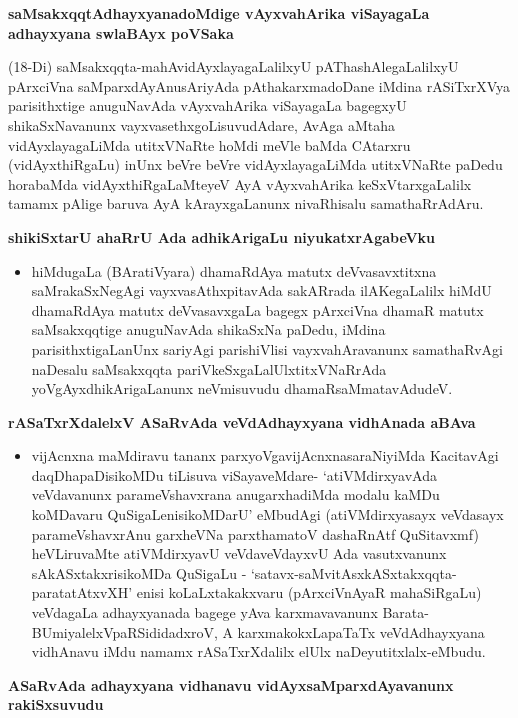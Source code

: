 \noindent
\textbf{saMsakxqqtAdhayxyanadoMdige vAyxvahArika viSayagaLa adhayxyana swlaBAyx poVSaka}\label{page47}

(18-Di) saMsakxqqta-mahAvidAyxlayagaLalilxyU pAThashAlegaLalilxyU pArxciVna saMparxdAyAnusAriyAda pAthakarxmadoDane iMdina rASiTxrXVya parisithxtige anuguNavAda vAyxvahArika viSayagaLa bagegxyU shikaSxNavanunx vayxvasethxgoLisuvudAdare, AvAga aMtaha vidAyxlayagaLiMda utitxVNaRte hoMdi meVle baMda CAtarxru (vidAyxthiRgaLu) inUnx beVre beVre vidAyxlayagaLiMda utitxVNaRte paDedu horabaMda vidAyxthiRgaLaMteyeV AyA vAyxvahArika keSxVtarxgaLalilx tamamx pAlige baruva AyA kArayxgaLanunx nivaRhisalu samathaRrAdAru.

\noindent
\textbf{shikiSxtarU ahaRrU Ada adhikArigaLu niyukatxrAgabeVku}

\begin{itemize}
\item[18-ef] hiMdugaLa (BAratiVyara) dhamaRdAya matutx deVvasavxtitxna saMrakaSxNegAgi vayxvasAthxpitavAda sakARrada ilAKegaLalilx hiMdU dhamaRdAya matutx deVvasavxgaLa bagegx pArxciVna dhamaR matutx saMsakxqqtige anuguNavAda shikaSxNa paDedu, iMdina parisithxtigaLanUnx sariyAgi parishiVlisi vayxvahAravanunx samathaRvAgi naDesalu saMsakxqqta pariVkeSxgaLalUlxtitxVNaRrAda yoVgAyxdhikArigaLanunx neVmisuvudu dhamaRsaMmatavAdudeV.
\end{itemize}

\noindent
\textbf{rASaTxrXdalelxV ASaRvAda veVdAdhayxyana vidhAnada aBAva}\label{page47}

\begin{itemize}
\item[19-e] vijAcnxna maMdiravu tananx parxyoVgavijAcnxnasaraNiyiMda KacitavAgi daqDhapaDisikoMDu tiLisuva viSayaveMdare- `atiVMdirxyavAda veVdavanunx parameVshavxrana anugarxhadiMda modalu kaMDu koMDavaru QuSigaLenisikoMDarU' eMbudAgi (atiVMdirxyasayx veVdasayx\label{47} parameVshavxrAnu garxheVNa parxthamatoV dashaRnAtf QuSitavxmf) heVLiruvaMte atiVMdirxyavU veVdaveVdayxvU Ada vasutxvanunx sAkASxtakxrisikoMDa QuSigaLu - `satavx-saMvitAsxkASxtakxqqta-paratatAtxvXH'\label{48} enisi koLaLxtakakxvaru (pArxciVnAyaR mahaSiRgaLu) veVdagaLa adhayxyanada bagege yAva karxmavavanunx Barata-BUmiyalelxVpaRSididadxroV, A karxmakokxLapaTaTx veVdAdhayxyana vidhAnavu iMdu namamx rASaTxrXdalilx elUlx naDeyutitxlalx-eMbudu.
\end{itemize}

\noindent
\textbf{ASaRvAda adhayxyana vidhanavu vidAyxsaMparxdAyavanunx rakiSxsuvudu}\label{page48}

